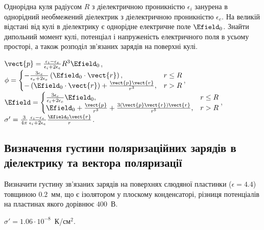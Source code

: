 \begin{problem}\label{sphere:Dielectric_in_Dielectric}%
Однорідна куля радіусом $R$ з діелектричною проникністю $\epsilon_i$ занурена в однорідний необмежений діелектрик з діелектричною проникністю $\epsilon_e$. На великій відстані від кулі в діелектрику є однорідне електричне поле $\Efield_0$. Знайти дипольний момент кулі, потенціал і напруженість електричного поля в усьому просторі, а також розподіл зв'язаних зарядів на поверхні кулі.
\begin{solution}
	$\vect{p} = \frac{\epsilon_i - \epsilon_e}{\epsilon_i + 2\epsilon_e}R^3\Efield_0$,
	$
		\phi =
		\begin{cases}
			-\frac{3\epsilon_e}{\epsilon_e + 2\epsilon_e}\left( \Efield_0\cdot \vect{r}\right), & r \le R \\
			-\left( \Efield_0\cdot \vect{r}\right) + \frac{\vect{p} \vect{r}}{r^3},             & r > R
		\end{cases}
	$,\\
	$
		\Efield =
		\begin{cases}
			\frac{3\epsilon_e}{\epsilon_i + 2\epsilon_e} \Efield_0,                                 & r \le R \\
			\Efield_0 + \frac{\vect{p}}{r^3} + \frac{3\left(\vect{p}\vect{r}\right)\vect{r} }{r^5}, & r > R
		\end{cases}
	$,
	$\sigma' = \frac{3}{4\pi} \frac{\epsilon_i - \epsilon_e}{\epsilon_i + 2\epsilon_e} \frac{\Efield_0\vect{r}}{r}$.
\end{solution}
\end{problem}

\subsection*{Визначення густини поляризаційних зарядів в діелектрику та вектора поляризації}

\begin{problem}
Визначити густину зв'язаних зарядів на поверхнях слюдяної пластинки ($\epsilon = 4.4$) товщиною $0.2$~мм, що є ізолятором у плоскому конденсаторі, різниця потенціалів на пластинах якого  дорівнює $400$~В.
\begin{solution}
	$\sigma' = 1.06\cdot10^{-8}$~К/см$^2$.
\end{solution}
\end{problem}

